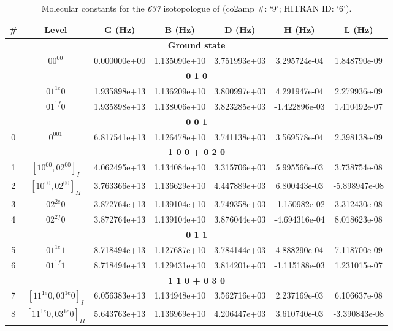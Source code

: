 \begin{table}[h!]
\caption{Molecular constants for the \textit{637} isotopologue of  (co2amp \#: ‘9’; HITRAN ID: ‘6’).}
\label{table:constants_637}
\centering
\begin{tabular}{|c|c|c|c|c|c|c|}
\hline
\textbf{\#} & \textbf{Level} & \textbf{G (Hz)} & \textbf{B (Hz)} & \textbf{D (Hz)} & \textbf{H (Hz)} & \textbf{L (Hz)} \\ \hline
\multicolumn{7}{|c|}{\textbf{Ground state}} \\ \hline
 & $00^00$ & 0.000000e+00 & 1.135090e+10 & 3.751993e+03 & 3.295724e-04 & 1.848790e-09 \\ \hline
\multicolumn{7}{|c|}{\textbf{0 1 0}} \\ \hline
 & $01^{1e}0$ & 1.935898e+13 & 1.136209e+10 & 3.800997e+03 & 4.291947e-04 & 2.279936e-09 \\ \hline
 & $01^{1f}0$ & 1.935898e+13 & 1.138006e+10 & 3.823285e+03 & -1.422896e-03 & 1.410492e-07 \\ \hline
\multicolumn{7}{|c|}{\textbf{0 0 1}} \\ \hline
0 & $0^001$ & 6.817541e+13 & 1.126478e+10 & 3.741138e+03 & 3.569578e-04 & 2.398138e-09 \\ \hline
\multicolumn{7}{|c|}{\textbf{1 0 0 + 0 2 0}} \\ \hline
1 & $[10^00, 02^00]_{I}$ & 4.062495e+13 & 1.134084e+10 & 3.315706e+03 & 5.995566e-03 & 3.738754e-08 \\ \hline
2 & $[10^00, 02^00]_{II}$ & 3.763366e+13 & 1.136629e+10 & 4.447889e+03 & 6.800443e-03 & -5.898947e-08 \\ \hline
3 & $02^{2e}0$ & 3.872764e+13 & 1.139104e+10 & 3.749358e+03 & -1.150982e-02 & 3.312430e-08 \\ \hline
4 & $02^{2f}0$ & 3.872764e+13 & 1.139104e+10 & 3.876044e+03 & -4.694316e-04 & 8.018623e-08 \\ \hline
\multicolumn{7}{|c|}{\textbf{0 1 1}} \\ \hline
5 & $01^{1e}1$ & 8.718494e+13 & 1.127687e+10 & 3.784144e+03 & 4.888290e-04 & 7.118700e-09 \\ \hline
6 & $01^{1f}1$ & 8.718494e+13 & 1.129431e+10 & 3.814201e+03 & -1.115188e-03 & 1.231015e-07 \\ \hline
\multicolumn{7}{|c|}{\textbf{1 1 0 + 0 3 0}} \\ \hline
7 & $[11^{1e}0, 03^{1e}0]_{I}$ & 6.056383e+13 & 1.134948e+10 & 3.562716e+03 & 2.237169e-03 & 6.106637e-08 \\ \hline
8 & $[11^{1e}0, 03^{1e}0]_{II}$ & 5.643763e+13 & 1.136969e+10 & 4.206447e+03 & 3.610740e-03 & -3.390843e-08 \\ \hline

\end{tabular}
\end{table}
